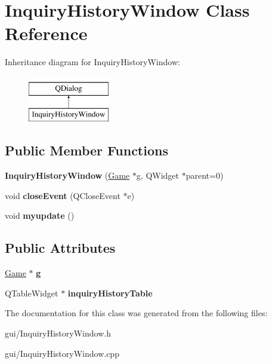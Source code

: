 \hypertarget{classInquiryHistoryWindow}{}\section{Inquiry\+History\+Window Class Reference}
\label{classInquiryHistoryWindow}
Inheritance diagram for Inquiry\+History\+Window\+:\begin{figure}[H]
\begin{center}
\leavevmode
\includegraphics[height=2.000000cm]{classInquiryHistoryWindow}
\end{center}
\end{figure}
\subsection*{Public Member Functions}
\begin{DoxyCompactItemize}
\item 
\mbox{\label{classInquiryHistoryWindow_a9a590b61cb46dfbaf2062defd4ecc1a3}} 
{\bfseries Inquiry\+History\+Window} (\hyperlink{classGame}{Game} $\ast$g, Q\+Widget $\ast$parent=0)
\item 
\mbox{\label{classInquiryHistoryWindow_a38d5323261a7ba223517235f608fcae6}} 
void {\bfseries close\+Event} (Q\+Close\+Event $\ast$e)
\item 
\mbox{\label{classInquiryHistoryWindow_ac57591d79ca9911cd085d80411a7d440}} 
void {\bfseries myupdate} ()
\end{DoxyCompactItemize}
\subsection*{Public Attributes}
\begin{DoxyCompactItemize}
\item 
\mbox{\label{classInquiryHistoryWindow_ad3c99570687772e595bffd9160678471}} 
\hyperlink{classGame}{Game} $\ast$ {\bfseries g}
\item 
\mbox{\label{classInquiryHistoryWindow_a21f2011f43eadd1c236ba1ffc6a035ae}} 
Q\+Table\+Widget $\ast$ {\bfseries inquiry\+History\+Table}
\end{DoxyCompactItemize}


The documentation for this class was generated from the following files\+:\begin{DoxyCompactItemize}
\item 
gui/Inquiry\+History\+Window.\+h\item 
gui/Inquiry\+History\+Window.\+cpp\end{DoxyCompactItemize}
